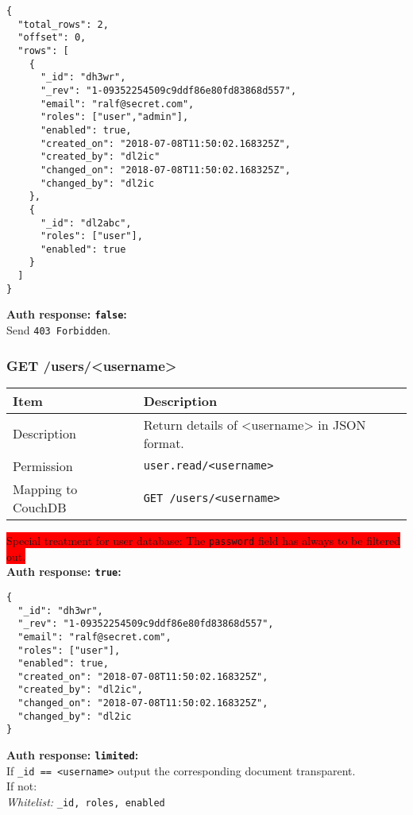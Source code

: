 \begin{lstlisting}
{
  "total_rows": 2,
  "offset": 0,
  "rows": [
    {
      "_id": "dh3wr",
      "_rev": "1-09352254509c9ddf86e80fd83868d557",
      "email": "ralf@secret.com",
      "roles": ["user","admin"],
      "enabled": true,
      "created_on": "2018-07-08T11:50:02.168325Z",
      "created_by": "dl2ic"
      "changed_on": "2018-07-08T11:50:02.168325Z",
      "changed_by": "dl2ic
    },
    {
      "_id": "dl2abc",
      "roles": ["user"],
      "enabled": true
    }
  ]
}
\end{lstlisting}

\textbf{Auth response: \texttt{false}:}\\
Send \verb|403 Forbidden|.

\newpage
\subsubsection{GET /users/<username>}
\label{protocoldef:microservicesapi:database:getusers/username}

\begin{table}[htbp]
  \begin{tabular}{|l|p{12cm}|} \hline
    Item               & Description  \\ \hline \hline
    Description        & Return details of <username> in JSON format. \\ \hline
    Permission         & \verb|user.read/<username>| \\ \hline
    Mapping to CouchDB & \verb|GET /users/<username>|\\ \hline
  \end{tabular}
\end{table}

\colorbox{red}{Special treatment for user database: The \texttt{password} field has always to be filtered out.}\\

\textbf{Auth response: \texttt{true}:}
\begin{lstlisting}
{
  "_id": "dh3wr",
  "_rev": "1-09352254509c9ddf86e80fd83868d557",
  "email": "ralf@secret.com",
  "roles": ["user"],
  "enabled": true,
  "created_on": "2018-07-08T11:50:02.168325Z",
  "created_by": "dl2ic",
  "changed_on": "2018-07-08T11:50:02.168325Z",
  "changed_by": "dl2ic
}
\end{lstlisting}

\textbf{Auth response: \texttt{limited}:}\\
If \verb|_id == <username>| output the corresponding document transparent.\\
If not:\\
\textit{Whitelist:} \verb|_id, roles, enabled|

